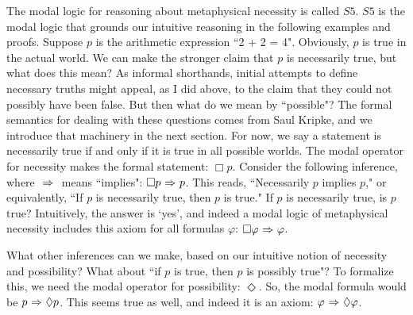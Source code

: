The modal logic for reasoning about metaphysical necessity is called $\mathit{S5}$. $\mathit{S5}$ is the modal logic that grounds our intuitive reasoning in the following examples and proofs. Suppose $p$ is the arithmetic expression ``2 + 2 = 4". Obviously, $p$ is true in the actual world. We can make the stronger claim that $p$ is necessarily true, but what does this mean? As informal shorthands, initial attempts to define necessary truths might appeal, as I did above, to the claim that they could not possibly have been false. But then what do we mean by ``possible"? The formal semantics for dealing with these questions comes from Saul Kripke, and we introduce that machinery in the next section. For now, we say a statement is necessarily true if and only if it is true in all possible worlds. The modal operator for necessity makes the formal statement: $\Box p$. Consider the following inference, where ${\ \Rightarrow \ }$ means ``implies": $\Box p {\ \Rightarrow \ } p$. This reads, ``Necessarily $p$ implies $p$," or equivalently, ``If $p$ is necessarily true, then $p$ is true." If $p$ is necessarily true, is $p$ true? Intuitively, the answer is `yes', and indeed a modal logic of metaphysical necessity includes this axiom for all formulas $\varphi$: $\Box \varphi {\ \Rightarrow \ } \varphi$. 

What other inferences can we make, based on our intuitive notion of necessity and possibility? What about ``if $p$ is true, then $p$ is possibly true"? To formalize this, we need the modal operator for possibility: $\Diamond$. So, the modal formula would be $p {\ \Rightarrow \ } \Diamond p$. This seems true as well, and indeed it is an axiom: $\varphi {\ \Rightarrow \ } \Diamond \varphi$. 

	
